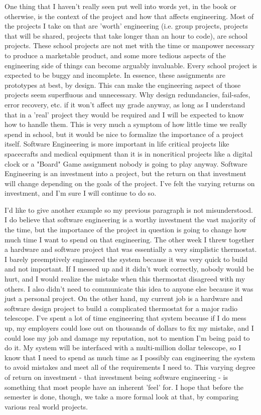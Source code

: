 \documentclass[prb,preprint]{revtex4-2}
\begin{document}
One thing that I haven't really seen put well into words yet, in the book or otherwise, is the context of the project and how that affects engineering. Most of the projects I take on that are 'worth' engineering (i.e. group projects, projects that will be shared, projects that take longer than an hour to code), are school projects. These school projects are not met with the time or manpower necessary to produce a marketable product, and some more tedious aspects of the engineering side of things can become arguably invaluable. Every school project is expected to be buggy and incomplete. In essence, these assignments are prototypes at best, by design. This can make the engineering aspect of those projects seem superfluous and unnecessary. Why design redundancies, fail-safes, error recovery, etc. if it won't affect my grade anyway, as long as I understand that in a 'real' project they would be required and I will be expected to know how to handle them. This is very much a symptom of how little time we really spend in school, but it would be nice to formalize the importance of a project itself. Software Engineering is more important in life critical projects like spacecrafts and medical equipment than it is in noncritical projects like a digital clock or a "Board" Game assignment nobody is going to play anyway. Software Engineering is an investment into a project, but the return on that investment will change depending on the goals of the project. I've felt the varying returns on investment, and I'm sure I will continue to do so.

I'd like to give another example so my previous paragraph is not misunderstood. I do believe that software engineering is a worthy investment the vast majority of the time, but the importance of the project in question is going to change how much time I want to spend on that engineering. The other week I threw together a hardware and software project that was essentially a very simplistic thermostat. I barely preemptively engineered the system because it was very quick to build and not important. If I messed up and it didn't work correctly, nobody would be hurt, and I would realize the mistake when this thermostat disagreed with my others. I also didn't need to communicate this idea to anyone else because it was just a personal project. On the other hand, my current job is a hardware and software design project to build a complicated thermostat for a major radio telescope. I've spent a lot of time engineering that system because if I do mess up, my employers could lose out on thousands of dollars to fix my mistake, and I could lose my job and damage my reputation, not to mention I'm being paid to do it. My system will be interfaced with a multi-million dollar telescope, so I know that I need to spend as much time as I possibly can engineering the system to avoid mistakes and meet all of the requirements I need to. This varying degree of return on investment - that investment being software engineering - is something that most people have an inherent 'feel' for. I hope that before the semester is done, though, we take a more formal look at that, by comparing various real world projects.
\end{document}
